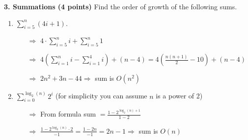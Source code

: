 \documentclass[12pt]{elsart}
\begin{document}
{\bf 3. Summations (4 points)}
Find the order of growth of the following sums.
\begin{enumerate}
\item $\sum\limits_{i=5}^{n} (4i+1). $
	\begin{itemize}
	\item[$\Rightarrow$] $4 \cdot \sum\limits_{i=5}^{n} i + \sum\limits_{i=5}^{n} 1$
	\item[$\Rightarrow$] $4(\sum\limits_{i=1}^{n} i - \sum\limits_{i=1}^{4} i) + (n - 4) = 4(\frac{n(n + 1)}{2} - 10) + (n - 4)$
	\item[$\Rightarrow$] $2n^2 + 3n - 44 \Rightarrow$ sum is $O(n^2)$
	\end{itemize}

\item $\sum\limits_{i=0}^{ \log_2 (n) } 2^i$  (for simplicity you can assume $n$ is a power of 2)
	\begin{itemize}
	\item[$\Rightarrow$] From formula sum $= \frac{1 - 2^{\log_2(n) + 1}}{1 - 2}$
	\item[$\Rightarrow$] $\frac{1 - 2^{\log_2(n)} \cdot 2}{-1} = \frac{1 - 2n}{-1} = 2n - 1 \Rightarrow$ sum is $O(n)$
	\end{itemize}
\end{enumerate}
\end{document}
